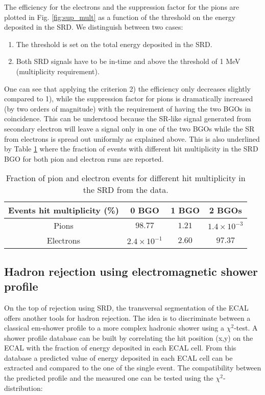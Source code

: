 The efficiency for the electrons and the suppression factor for the pions are plotted in Fig. \ref{fig:sup_mult} as a function of the threshold on the energy deposited in the SRD. We distinguish between two cases:
\begin{enumerate}
\item The threshold is set on the total energy deposited in the SRD.
\item Both SRD signals have to be in-time and above the threshold of 1 MeV (multiplicity requirement).
\end{enumerate}
One can see that applying the criterion 2) the efficiency only decreases slightly compared to 1), while the suppression factor for pions is dramatically increased (by two orders of magnitude) with the requirement of having the two BGOs in coincidence.
This can be understood because the SR-like signal generated from secondary electron will leave a signal only in one of the two BGOs while the SR from electrons is spread out uniformly as explained above. 
This is also underlined by Table  \ref{tab:hits} where the fraction of events with different hit multiplicity in the SRD BGO for both pion and electron runs are reported.

\begin{table}[hbt!]
\begin{center}
\begin{tabular}{cccc}
Events hit multiplicity  (\%) & 0 BGO  & 1 BGO & 2 BGOs\\
\hline
Pions & $98.77$ & $1.21$ & $1.4\times10^{-3}$  \\
Electrons & $2.4\times10^{-1}$  & $2.60$ & $97.37$ \\
\end{tabular}
\end{center}
\caption[Fraction of pion and electron events for different hit multiplicity in the SRD from the data]{Fraction of pion and electron events for different hit multiplicity in the SRD from the data.}
\label{tab:hits}

\end{table}

\subsection{Hadron rejection using electromagnetic shower profile}
\label{ch3:sec:bkg-ecal-profile}

On the top of rejection using SRD, the transversal segmentation of the ECAL offers another tools for hadron rejection. The idea is to discriminate between a classical em-shower profile to a more complex hadronic shower using a $\chi^2$-test. A shower profile database can be built by correlating the hit position (x,y) on the ECAL with the fraction of energy deposited in each ECAL cell. From this database a predicted value of energy deposited in each ECAL cell can be extracted and compared to the one of the single event. The compatibility between the predicted profile and the measured one can be tested using the $\chi^2$-distribution:


